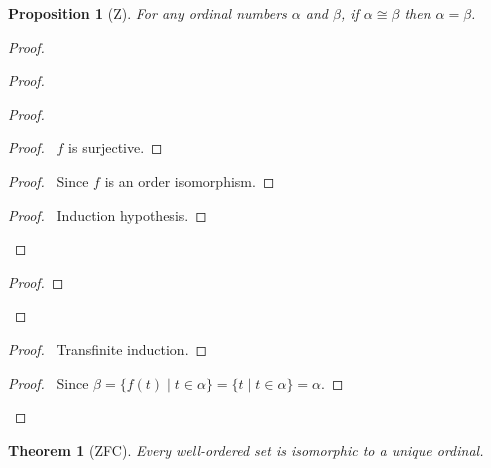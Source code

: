 \documentclass{book}
\let\qed\relax
\newtheorem{prop}[ax]{Proposition}
\newtheorem{thm}[ax]{Theorem}
\theoremstyle{definition}
\begin{document}
\begin{prop}[Z]
\label{prop:ordisoeq}
For any ordinal numbers $\alpha$ and $\beta$, if $\alpha \cong \beta$ then $\alpha = \beta$.
\end{prop}

\begin{proof}
\pf
{}
\begin{proof}
	\begin{proof}
		\begin{proof}
			\pf\ $f$ is surjective.
		\end{proof}
		\begin{proof}
			\pf\ Since $f$ is an order isomorphism.
		\end{proof}
		\begin{proof}
			\pf\ Induction hypothesis.
		\end{proof}
	\end{proof}
	\begin{proof}
	\end{proof}
\end{proof}
\begin{proof}
	\pf\ Transfinite induction.
\end{proof}
\begin{proof}
	\pf\ Since $\beta = \{ f(t) \mid t \in \alpha \} = \{ t \mid t \in \alpha \} = \alpha$.
\end{proof}
\qed
\end{proof}

\begin{thm}[ZFC]
Every well-ordered set is isomorphic to a unique ordinal.
\end{thm}
\end{document}
